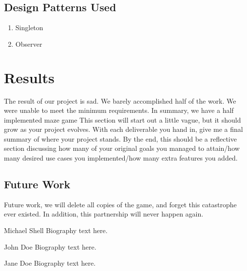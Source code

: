 \documentclass[10pt,conference,onecolumn,compsoc]{IEEEtran}
\begin{document}
\subsection{Design Patterns Used}
\begin{enumerate}
\item Singleton
\item Observer
\end{enumerate}


\section{Results}
The result of our project is sad. We barely accomplished half of the work. We were unable to meet the minimum requirements. In summary, we have a half implemented maze game
This section will start out a little vague, but it should grow as your project evolves.  With each deliverable you hand in, give me a final summary of where your project stands.  By the end, this should be a reflective section discussing how many of your original goals you managed to attain/how many desired use cases you implemented/how many extra features you added.

\subsection{Future Work}
Future work, we will delete all copies of the game, and forget this catastrophe ever existed. In addition, this partnership will never happen again.







\begin{IEEEbiography}{Michael Shell}
Biography text here.
\end{IEEEbiography}

\begin{IEEEbiographynophoto}{John Doe}
Biography text here.
\end{IEEEbiographynophoto}


\begin{IEEEbiographynophoto}{Jane Doe}
Biography text here.
\end{IEEEbiographynophoto}





\end{document}
